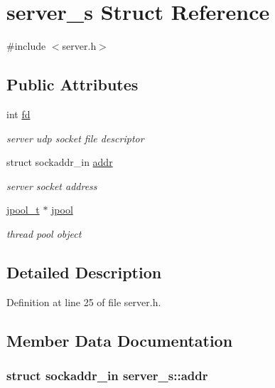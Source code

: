 \hypertarget{structserver__s}{\section{server\-\_\-s Struct Reference}
\label{structserver__s}
}


{\ttfamily \#include $<$server.\-h$>$}

\subsection*{Public Attributes}
\begin{DoxyCompactItemize}
\item 
int \hyperlink{structserver__s_a6129acbc6b313f77efeb488754f559ec}{fd}
\begin{DoxyCompactList}\small\item\em server udp socket file descriptor \end{DoxyCompactList}\item 
struct sockaddr\-\_\-in \hyperlink{structserver__s_a09fe17ff633d4d26a4080d46749c1fe3}{addr}
\begin{DoxyCompactList}\small\item\em server socket address \end{DoxyCompactList}\item 
\hyperlink{structjpool__t}{jpool\-\_\-t} $\ast$ \hyperlink{structserver__s_ac45d9f57c1cf8b4841843284d319072b}{jpool}
\begin{DoxyCompactList}\small\item\em thread pool object \end{DoxyCompactList}\end{DoxyCompactItemize}


\subsection{Detailed Description}


Definition at line 25 of file server.\-h.



\subsection{Member Data Documentation}
\hypertarget{structserver__s_a09fe17ff633d4d26a4080d46749c1fe3}{
\subsubsection[{addr}]{\setlength{\rightskip}{0pt plus 5cm}struct sockaddr\-\_\-in server\-\_\-s\-::addr}}\label{structserver__s_a09fe17ff633d4d26a4080d46749c1fe3}


